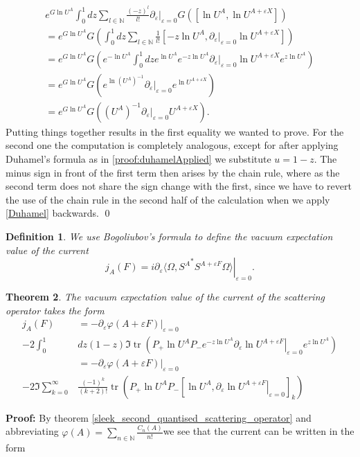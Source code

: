 \documentclass[b5paper,draft,openbib,12pt]{memoir}
\newtheorem{Def}{Definition}
\newtheorem{Thm}[Def]{Theorem}
\DeclareMathOperator{\tr}{tr}
\begin{document}
\begin{multline}
e^{G \ln U^A} \int_0^1 d z \sum_{l\in\mathbb{N}} \frac{(-z)^l}{l!} \partial_\varepsilon |_{\varepsilon=0} G\left(\left[ \ln U^A, \ln U^{A+\varepsilon X}\right]\right) \\
=e^{G \ln U^A}  G\left( \int_0^1 d z \sum_{l\in\mathbb{N}} \frac{1}{l!}  \left[ -z \ln U^A,\partial_\varepsilon|_{\varepsilon=0} \ln U^{A+\varepsilon X}\right]\right) \\
=e^{G \ln U^A}  G\left(e^{- \ln U^A} \int_0^1 d z e^{ \ln U^A} e^{-z \ln U^A}\partial_\varepsilon|_{\varepsilon=0} \ln U^{A+\varepsilon X} e^{z \ln U^A}\right) \\
=e^{G \ln U^A}  G\left(e^{ \ln \left(U^A\right)^{-1}} \partial_\varepsilon|_{\varepsilon=0} e^{ \ln U^{A+\varepsilon X}} \right) \\
=e^{G \ln U^A}  G\left(\left(U^A\right)^{-1} \partial_\varepsilon|_{\varepsilon=0}U^{A+\varepsilon X} \right).
\end{multline}
Putting things together results in the first equality we wanted to prove. For the second one the computation is completely analogous, except for after applying Duhamel's formula as in \eqref{proof:duhamelApplied} we substitute \(u=1-z\). The minus sign in front of the first term then arises by the chain rule, where as the second term does not share the sign change with the first, since we have to revert the use of the chain rule in the second half of the calculation when we apply  \eqref{Duhamel} backwards. \qed

\begin{Def}
We use Bogoliubov's formula to define the vacuum expectation value of the current 
\begin{equation}
j_A(F) = i \partial_{\varepsilon}\left. \langle \Omega, {S^{A} }^* S^{A+\varepsilon F}\Omega \rangle \right|_{\varepsilon=0}.
\end{equation}
\end{Def}



\begin{Thm}\label{thm:CurrentExact}
The vacuum expectation value of the current of the scattering operator takes the form
\begin{align*}
j_A(F)&=- \partial_{\varepsilon} \left. \varphi(A+\varepsilon F) \right|_{\varepsilon=0}\\
-2\int_0^1 &d z (1-z)  \Im \tr\left(P_+ \ln U^A P_- e^{ -z \ln U^A} \partial_{\varepsilon} \left. \ln U^{A+\varepsilon F}\right|_{\varepsilon=0} e^{ z \ln U^A}\right)\\
&=- \partial_{\varepsilon} \left.\varphi(A+\varepsilon F) \right|_{\varepsilon=0}\\
  - 2\Im \sum_{k=0}^\infty&\frac{(-1)^k}{(k+2)!}  \tr \left( P_+ \ln U^A P_-\left[\ln U^A,\left.\partial_{\varepsilon}\ln U^{A+\varepsilon F} \right|_{\varepsilon=0}\right]_{k}\right) 
\end{align*}
\end{Thm}
\textbf{Proof:} By theorem \ref{sleek_second_quantised_scattering_operator} and abbreviating
\(\varphi(A)= \sum_{n\in\mathbb{N}} \frac{C_n(A)}{n!} \)we see that the current can be written in the form
\end{document}
